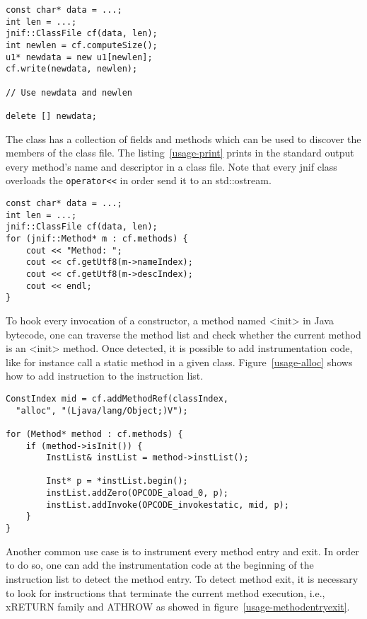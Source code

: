 \begin{lstlisting}[caption=Encoding a class,label=usage-write]
const char* data = ...;
int len = ...;
jnif::ClassFile cf(data, len);
int newlen = cf.computeSize();
u1* newdata = new u1[newlen];
cf.write(newdata, newlen);

// Use newdata and newlen

delete [] newdata;
\end{lstlisting}

The  class has a collection of fields and methods which can be used to discover the members of the class file. 
The listing~\ref{usage-print} prints in the standard output every method's name and descriptor in a class file. 
Note that every jnif class overloads the \verb|operator<<| in order send it to an std::ostream.

\begin{lstlisting}[caption=Traversing all methods in a class,label=usage-print]
const char* data = ...;
int len = ...;
jnif::ClassFile cf(data, len);
for (jnif::Method* m : cf.methods) {
	cout << "Method: ";
	cout << cf.getUtf8(m->nameIndex);
	cout << cf.getUtf8(m->descIndex);
	cout << endl;
}
\end{lstlisting}

To hook every invocation of a constructor, a method named <init> in Java bytecode, 
one can traverse the method list and check whether the current method is an <init> method. 
Once detected, it is possible to add instrumentation code, like for instance call a static method in a given class. 
Figure~\ref{usage-alloc} shows how to add instruction to the instruction list.

\begin{lstlisting}[caption=Instrumenting constructor entries,label=usage-alloc]
ConstIndex mid = cf.addMethodRef(classIndex, 
  "alloc", "(Ljava/lang/Object;)V");

for (Method* method : cf.methods) {
	if (method->isInit()) {
		InstList& instList = method->instList();

		Inst* p = *instList.begin();
		instList.addZero(OPCODE_aload_0, p);
		instList.addInvoke(OPCODE_invokestatic, mid, p);
	}
}
\end{lstlisting}




Another common use case is to instrument every method entry and exit. In order to do so, one can add the instrumentation code at the beginning of the instruction list to detect the method entry. To detect method exit, it is necessary to look for instructions that terminate the current method execution, i.e., xRETURN family and ATHROW as showed in figure~\ref{usage-methodentryexit}.

